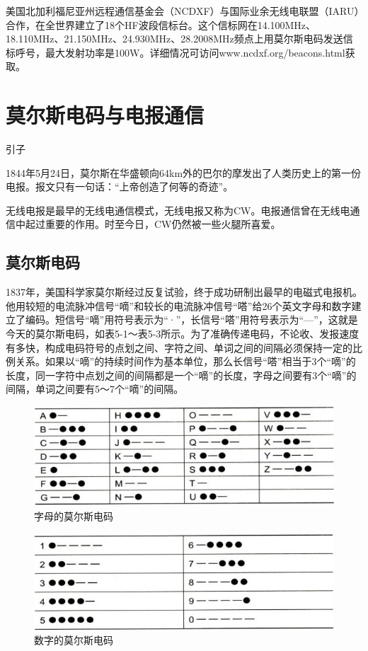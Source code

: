 \documentclass[12pt,UTF8]{ctexbook}
\begin{document}
美国北加利福尼亚州远程通信基金会（NCDXF）与国际业余无线电联盟（IARU）合作，在全世界建立了18个HF波段信标台。这个信标网在14.100MHz、18.110MHz、21.150MHz、24.930MHz、28.2008MHz频点上用莫尔斯电码发送信标呼号，最大发射功率是100W。详细情况可访问www.ncdxf.org/beacons.html获取。

\chapter{莫尔斯电码与电报通信}

引子

1844年5月24日，莫尔斯在华盛顿向64km外的巴尔的摩发出了人类历史上的第一份电报。报文只有一句话：“上帝创造了何等的奇迹”。

无线电报是最早的无线电通信模式，无线电报又称为CW。电报通信曾在无线电通信中起过重要的作用。时至今日，CW仍然被一些火腿所喜爱。

\section{莫尔斯电码}

1837年，美国科学家莫尔斯经过反复试验，终于成功研制出最早的电磁式电报机。他用较短的电流脉冲信号“嘀”和较长的电流脉冲信号“嗒”给26个英文字母和数字建立了编码。短信号“嘀”用符号表示为“·”，长信号“嗒”用符号表示为“—”，这就是今天的莫尔斯电码，如表5-1～表5-3所示。为了准确传递电码，不论收、发报速度有多快，构成电码符号的点划之间、字符之间、单词之间的间隔必须保持一定的比例关系。如果以“嘀”的持续时间作为基本单位，那么长信号“嗒”相当于3个“嘀”的长度，同一字符中点划之间的间隔都是一个“嘀”的长度，字母之间要有3个“嘀”的间隔，单词之间要有5～7个“嘀”的间隔。

\begin{figure}[htbp]
	\centering
	\includegraphics[width=0.7\linewidth]{60}
	\caption{字母的莫尔斯电码}
	\label{fig:1}
\end{figure}

\begin{figure}[htbp]
	\centering
	\includegraphics[width=0.7\linewidth]{61}
	\caption{数字的莫尔斯电码}
	\label{fig:1}
\end{figure}
\end{document}

